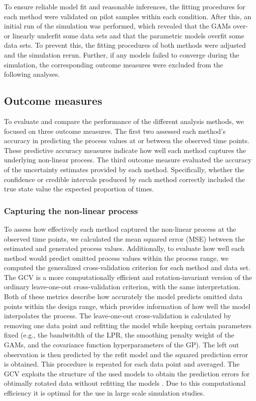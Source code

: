 \documentclass[man, floatsintext]{apa7}
\begin{document}
To ensure reliable model fit and reasonable inferences, the fitting procedures
for each method were validated on pilot samples within each condition. After
this, an initial run of the simulation was performed, which revealed that the
GAMs over- or linearly underfit some data sets and that the parametric models
overfit some data sets. To prevent this, the fitting procedures of both methods
were adjusted and the simulation rerun. Further, if any models failed to
converge during the simulation, the corresponding outcome measures were
excluded from the following analyses.

\subsection{Outcome measures}

To evaluate and compare the performance of the different analysis methods, we
focused on three outcome measures. The first two assessed each method's
accuracy in predicting the process values at or between the observed time
points. These predictive accuracy measures indicate how well each method
captures the underlying non-linear process. The third outcome measure evaluated
the accuracy of the uncertainty estimates provided by each method.
Specifically, whether the confidence or credible intervals produced by each
method correctly included the true state value the expected proportion of
times.

\subsubsection{Capturing the non-linear process}

To assess how effectively each method captured the non-linear process at the
observed time points, we calculated the mean squared error (MSE) between the
estimated and generated process values. Additionally, to evaluate how well each
method would predict omitted process values within the process range, we
computed the generalized cross-validation
\parencite[GCV;][]{golub_generalized_1979} criterion for each method and data
set. The GCV is a more computationally efficient and rotation-invariant version
of the ordinary leave-one-out cross-validation criterion, with the same
interpretation. Both of these metrics describe how accurately the model
predicts omitted data points within the design range, which provides
information
of how well the model interpolates the process. The leave-one-out
cross-validation is calculated by removing one data point and refitting
the model while keeping certain parameters fixed (e.g., the bandwitdth of the
LPR, the smoothing penalty weight of the GAMs, and the covariance function
hyperparameters of the GP). The left out observation is then predicted by
the refit model and the squared prediction error is obtained. This procedure
is repeated for each data point and averaged. The GCV exploits the structure of
the used models to obtain the prediction errors for obtimally rotated data
without refitting the models \parencite{golub_generalized_1979}. Due to this
computational efficiency it is optimal for the use in large scale simulation
studies.
\end{document}
